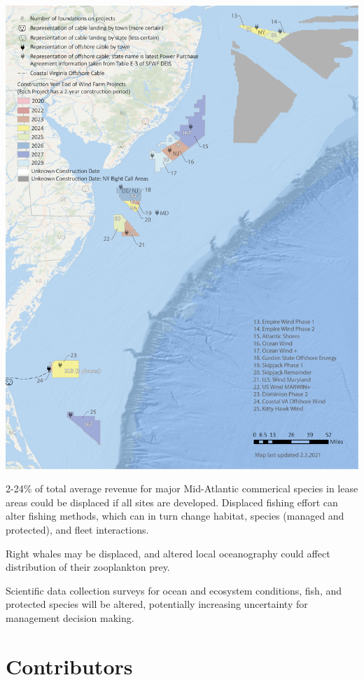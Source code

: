 \documentclass[
  10pt,
]{article}
\let\origfigure\figure
\let\endorigfigure\endfigure
\renewenvironment{figure}[1][2] {
    \expandafter\origfigure\expandafter[H]
} {
    \endorigfigure
}
\begin{document}
\begin{figure}

{\centering \includegraphics[width=0.7\linewidth]{images/MidAtlantic_2021128-01 (1)} 

}

\caption{Zoomed in areas with name of Project, number of foundations within each project area and the states that have declared power purchase agreements.}\label{fig:wind-dev-cumul-MAB}
\end{figure}

2-24\% of total average revenue for major Mid-Atlantic commerical
species in lease areas could be displaced if all sites are developed.
Displaced fishing effort can alter fishing methods, which can in turn
change habitat, species (managed and protected), and fleet interactions.

Right whales may be displaced, and altered local oceanography could
affect distribution of their zooplankton prey.

Scientific data collection surveys for ocean and ecosystem conditions,
fish, and protected species will be altered, potentially increasing
uncertainty for management decision making.

\hypertarget{contributors}{%
\section{Contributors}\label{contributors}}
\end{document}

